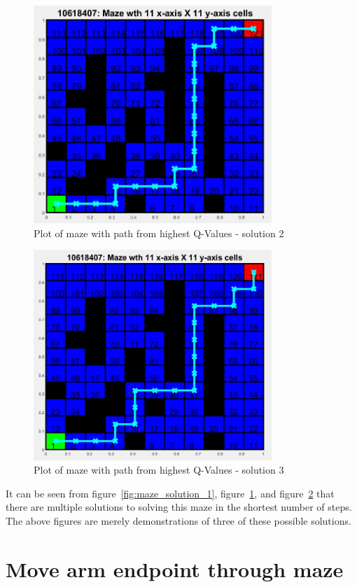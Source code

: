 \documentclass [11pt]{article}
\begin{document}
\begin{figure}[H]
\centerline{\includegraphics[width=9cm]{maze_solution_2}}
\caption{Plot of maze with path from highest Q-Values - solution 2}
\label{fig:maze_solution_2}
\end{figure}

\begin{figure}[H]
\centerline{\includegraphics[width=9cm]{maze_solution_3}}
\caption{Plot of maze with path from highest Q-Values - solution 3}
\label{fig:maze_solution_3}
\end{figure}

It can be seen from figure~\ref{fig:maze_solution_1}, figure~\ref{fig:maze_solution_2}, and figure~\ref{fig:maze_solution_3} that there are multiple solutions to solving this maze in the shortest number of steps. The above figures are merely demonstrations of three of these possible solutions. 

\section{Move arm endpoint through maze}
\end{document}
